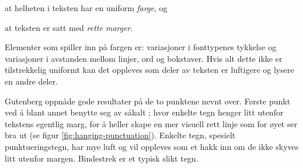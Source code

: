 \begin{items}
\item at helheten i teksten har en uniform \textit{farge}, og
\item at teksten er satt med \textit{rette marger}.
\end{items}

Elementer som spiller inn på fargen er: variasjoner i fonttypenes tykkelse og variasjoner i avstanden mellom linjer, ord og bokstaver. Hvis alt dette ikke er tilstrekkelig uniformt kan det oppleves som deler av teksten er luftigere og lysere en andre deler. 

Gutenberg oppnåde gode resultater på de to punktene nevnt over. Første punkt ved å blant annet benytte seg av såkalt ; hvor enkelte tegn henger litt utenfor tekstens egentlig marg, for å heller skape en mer visuell rett linje som for øyet ser bra ut (se figur \ref{fig:hanging-punctuation}). Enkelte tegn, spesielt punktueringstegn, har mye luft og vil oppleves som et hakk inn om de ikke skyves litt utenfor margen. Bindestrek er et typisk slikt tegn.

